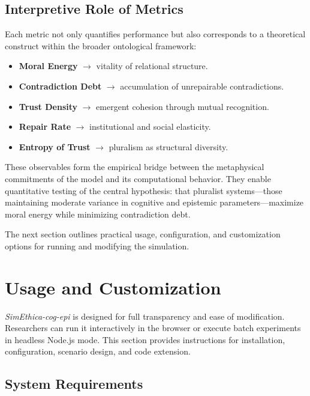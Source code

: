 \documentclass[11pt]{article}
\begin{document}
\subsection{Interpretive Role of Metrics}

Each metric not only quantifies performance but also corresponds to a theoretical construct within the broader ontological framework:

\begin{itemize}
  \item \textbf{Moral Energy} $\rightarrow$ vitality of relational structure.
  \item \textbf{Contradiction Debt} $\rightarrow$ accumulation of unrepairable contradictions.
  \item \textbf{Trust Density} $\rightarrow$ emergent cohesion through mutual recognition.
  \item \textbf{Repair Rate} $\rightarrow$ institutional and social elasticity.
  \item \textbf{Entropy of Trust} $\rightarrow$ pluralism as structural diversity.
\end{itemize}

These observables form the empirical bridge between the metaphysical commitments of the model and its computational behavior.  
They enable quantitative testing of the central hypothesis: that pluralist systems—those maintaining moderate variance in cognitive and epistemic parameters—maximize moral energy while minimizing contradiction debt.

\noindent
The next section outlines practical usage, configuration, and customization options for running and modifying the simulation.
\section{Usage and Customization}

\textit{SimEthica-cog-epi} is designed for full transparency and ease of modification.  
Researchers can run it interactively in the browser or execute batch experiments in headless Node.js mode.  
This section provides instructions for installation, configuration, scenario design, and code extension.

\subsection{System Requirements}
\end{document}
